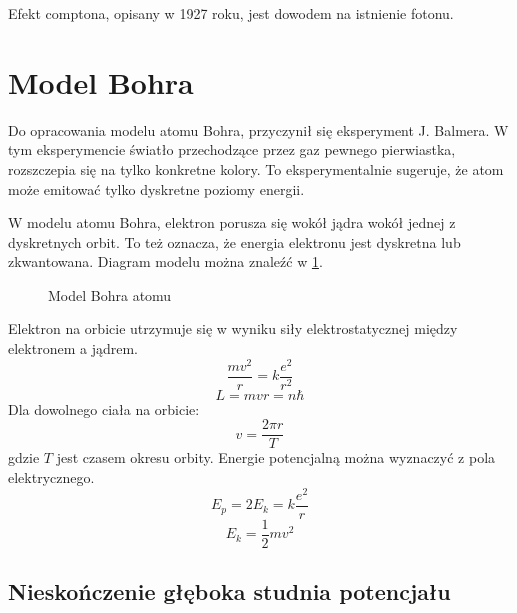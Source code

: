 \documentclass{../notatki}
\begin{document}
Efekt comptona, opisany w 1927 roku, jest dowodem na istnienie fotonu.

\section{Model Bohra}

Do opracowania modelu atomu Bohra, przyczynił się eksperyment J. Balmera. W tym
eksperymencie światło przechodzące przez gaz pewnego pierwiastka,
rozszczepia się na tylko konkretne kolory. To eksperymentalnie sugeruje, że
atom może emitować tylko dyskretne poziomy energii.

W modelu atomu Bohra, elektron porusza się wokół jądra wokół jednej z
dyskretnych
orbit. To też oznacza, że energia elektronu jest dyskretna lub zkwantowana.
Diagram modelu można znaleźć w \cref{fig:bohr}.
\begin{figure}[H]
  \centering
  \caption{Model Bohra atomu}
  \label{fig:bohr}
\end{figure}

Elektron na orbicie utrzymuje się w wyniku siły elektrostatycznej między
elektronem a jądrem.
$$
\frac{mv^2}{r} = k \frac{e^2}{r^2}
$$
$$
L = mvr = n\hbar
$$
Dla dowolnego ciała na orbicie:
$$
v = \frac{2\pi r}{T}
$$
gdzie $T$ jest czasem okresu orbity. Energie potencjalną można wyznaczyć z
pola elektrycznego.
$$
E_p = 2E_k = k\frac{e^2}{r}
$$
$$
E_k = \frac{1}{2}mv^2
$$

\subsection{Nieskończenie głęboka studnia potencjału}
\end{document}
